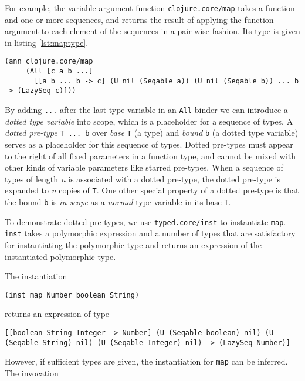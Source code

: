 For example, the variable argument function \lstinline|clojure.core/map| takes a function and one or more sequences,
and returns the result of applying the function argument to each element of the sequences in a pair-wise fashion.
Its type is given in listing \ref{lst:maptype}.

\begin{lstlisting}[caption=Type signature for \lstinline|clojure.core/map|, label=lst:maptype]
(ann clojure.core/map
     (All [c a b ...]
       [[a b ... b -> c] (U nil (Seqable a)) (U nil (Seqable b)) ... b -> (LazySeq c)]))
\end{lstlisting}

By adding \lstinline|...| after the last type variable in an \lstinline|All| binder
we can introduce a \emph{dotted type variable} into scope, which is a placeholder for a sequence of types.
A \emph{dotted pre-type} \lstinline|T ... b| over \emph{base} \lstinline|T| (a type) and \emph{bound}
\lstinline|b| (a dotted type variable)
serves as a placeholder for this sequence of types.
Dotted pre-types must appear to the right of all fixed parameters in a function type,
and cannot be mixed with other kinds of variable parameters like starred pre-types.
When a sequence of types of length \emph{n} is associated with a dotted pre-type, 
the dotted pre-type is expanded to \emph{n} copies of \lstinline|T|.
One other special property of a dotted pre-type is that the bound \lstinline|b|
is \emph{in scope} as a \emph{normal} type variable in its base \lstinline|T|.

To demonstrate dotted pre-types, we use \lstinline|typed.core/inst| to instantiate
\lstinline|map|. \lstinline|inst| takes a polymorphic expression and a number of types
that are satisfactory for instantiating the polymorphic type and returns an expression
of the instantiated polymorphic type.

The instantiation

\begin{lstlisting}
(inst map Number boolean String)
\end{lstlisting}

returns an expression of type

\begin{lstlisting}
[[boolean String Integer -> Number] (U (Seqable boolean) nil) (U (Seqable String) nil) (U (Seqable Integer) nil) -> (LazySeq Number)]
\end{lstlisting}

However, if sufficient types are given, the instantiation for \lstinline|map| can be inferred.
The invocation

